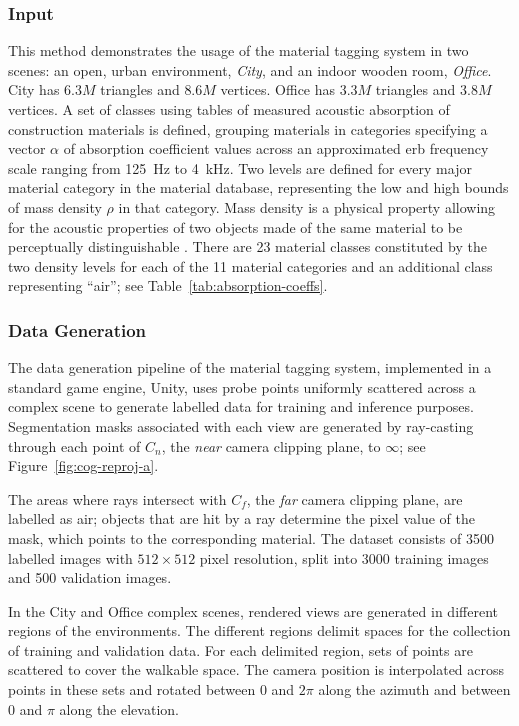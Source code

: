 \subsubsection{Input}
This method demonstrates the usage of the material tagging system in two scenes: an open, urban environment, \emph{City}, and an indoor wooden room, \emph{Office}. City has $6.3M$ triangles and $8.6M$ vertices. Office has $3.3M$ triangles and $3.8M$ vertices. A set of classes using tables of measured acoustic absorption of construction materials is defined, grouping materials in categories specifying a vector $\alpha$ of absorption coefficient values across an approximated \acrfull{erb} frequency scale ranging from \qty{125}{\Hz} to \qty{4}{\kHz}. Two levels are defined for every major material category in the material database, representing the low and high bounds of mass density $\rho$ in that category. Mass density is a physical property allowing for the acoustic properties of two objects made of the same material to be perceptually distinguishable \citep{giordano2006material}. There are 23 material classes constituted by the two density levels for each of the 11 material categories and an additional class representing ``air''; see Table~\ref{tab:absorption-coeffs}.

\subsubsection{Data Generation}
The data generation pipeline of the material tagging system, implemented in a standard game engine, Unity, uses probe points uniformly scattered across a complex scene to generate labelled data for training and inference purposes. Segmentation masks associated with each view are generated by ray-casting through each point of $C_n$, the \emph{near} camera clipping plane, to $\infty$; see Figure~\ref{fig:cog-reproj-a}.\par
The areas where rays intersect with $C_f$, the \emph{far} camera clipping plane, are labelled as air; objects that are hit by a ray determine the pixel value of the mask, which points to the corresponding material. The dataset consists of 3500 labelled images with $512\times512$ pixel resolution, split into 3000 training images and 500 validation images.\par
In the City and Office complex scenes, rendered views are generated in different regions of the environments. The different regions delimit spaces for the collection of training and validation data. For each delimited region, sets of points are scattered to cover the walkable space. The camera position is interpolated across points in these sets and rotated between 0 and $2\pi$ along the azimuth and between 0 and $\pi$ along the elevation.\par

